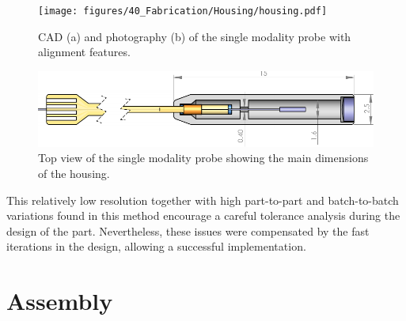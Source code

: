 \begin{figure}[h!]\centering \texttt{[image: figures/40\_Fabrication/Housing/housing.pdf]}
      \caption{CAD (a) and photography (b) of the single modality probe with alignment features.}
      \label{fig:housing}
\end{figure}

\begin{figure}[h!]\centering \includegraphics[width=\columnwidth]{figures/40_Fabrication/Housing/TopDrawing.pdf}
      \caption{Top view of the single modality probe showing the main dimensions of the housing.}
      \label{fig:housingDim}
\end{figure}

This relatively low resolution together with high part-to-part and batch-to-batch variations found in this method encourage a careful tolerance analysis during the design of the part. Nevertheless, these issues were compensated by the fast iterations in the design, allowing a successful implementation.


%

\section{Assembly}

